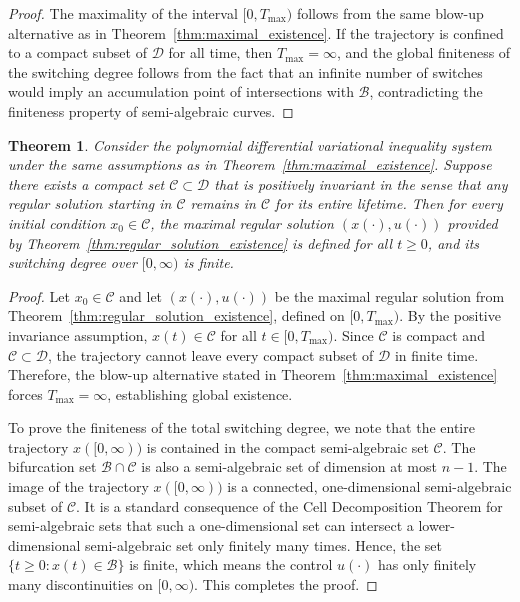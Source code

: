 \documentclass[sn-basic,Numbered]{sn-jnl}
\theoremstyle{thmstyleone}%
\newtheorem{theorem}{Theorem}%
\begin{document}
\begin{proof}
The maximality of the interval $[0, T_{\max})$ follows from the same blow-up alternative as in Theorem~\ref{thm:maximal_existence}. If the trajectory is confined to a compact subset of $\mathcal{D}$ for all time, then $T_{\max} = \infty$, and the global finiteness of the switching degree follows from the fact that an infinite number of switches would imply an accumulation point of intersections with $\mathcal{B}$, contradicting the finiteness property of semi-algebraic curves.
\end{proof}

\begin{theorem}\label{thm:global_existence}
Consider the polynomial differential variational inequality system under the same assumptions as in Theorem~\ref{thm:maximal_existence}. Suppose there exists a compact set $\mathcal{C} \subset \mathcal{D}$ that is positively invariant in the sense that any regular solution starting in $\mathcal{C}$ remains in $\mathcal{C}$ for its entire lifetime. Then for every initial condition $x_0 \in \mathcal{C}$, the maximal regular solution $(x(\cdot), u(\cdot))$ provided by Theorem~\ref{thm:regular_solution_existence} is defined for all $t \geq 0$, and its switching degree over $[0, \infty)$ is finite.
\end{theorem}

\begin{proof}
Let $x_0 \in \mathcal{C}$ and let $(x(\cdot), u(\cdot))$ be the maximal regular solution from Theorem~\ref{thm:regular_solution_existence}, defined on $[0, T_{\max})$. By the positive invariance assumption, $x(t) \in \mathcal{C}$ for all $t \in [0, T_{\max})$. Since $\mathcal{C}$ is compact and $\mathcal{C} \subset \mathcal{D}$, the trajectory cannot leave every compact subset of $\mathcal{D}$ in finite time. Therefore, the blow-up alternative stated in Theorem~\ref{thm:maximal_existence} forces $T_{\max} = \infty$, establishing global existence.

To prove the finiteness of the total switching degree, we note that the entire trajectory $x([0, \infty))$ is contained in the compact semi-algebraic set $\mathcal{C}$. The bifurcation set $\mathcal{B} \cap \mathcal{C}$ is also a semi-algebraic set of dimension at most $n-1$. The image of the trajectory $x([0, \infty))$ is a connected, one-dimensional semi-algebraic subset of $\mathcal{C}$. It is a standard consequence of the Cell Decomposition Theorem for semi-algebraic sets that such a one-dimensional set can intersect a lower-dimensional semi-algebraic set only finitely many times. Hence, the set $\{ t \geq 0 : x(t) \in \mathcal{B} \}$ is finite, which means the control $u(\cdot)$ has only finitely many discontinuities on $[0, \infty)$. This completes the proof.
\end{proof}
\end{document}
